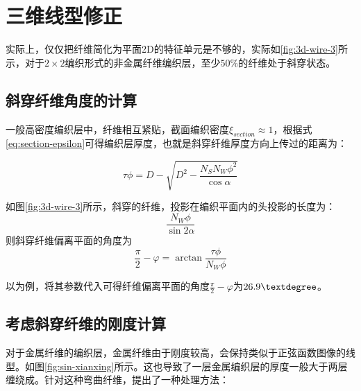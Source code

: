 \section{三维线型修正}

实际上，仅仅把纤维简化为平面2D的特征单元是不够的，实际如\ref{fig:3d-wire-3}所示，对于$ 2\times 2 $编织形式的非金属纤维编织层，至少$ 50 \% $的纤维处于斜穿状态。

\subsection{斜穿纤维角度的计算}
一般高密度编织层中，纤维相互紧贴，截面编织密度$ {\xi _{section}} \approx 1 $，根据式\ref{eq:section-epsilon}可得编织层厚度，也就是斜穿纤维厚度方向上传过的距离为：


\begin{equation}
\tau \phi  = D - \sqrt {{D^2} - \frac{{{N_S}{N_W}{\phi ^2}}}{{\cos \alpha }}} 
\end{equation}

如图\ref{fig:3d-wire-3}所示，斜穿的纤维，投影在编织平面内的头投影的长度为：
\begin{equation}
\frac{{{N_W}\phi }}{{\sin 2\alpha }}
\end{equation}
则斜穿纤维偏离平面的角度为
\begin{equation}
\frac{\pi }{2} - \varphi  = \arctan \frac{{\tau \phi}}{{{N_W}\phi }}
\end{equation}

以\shii 为例，将其参数代入可得纤维偏离平面的角度$ \frac{\pi }{2} - \varphi  $为$ 26.9\textdegree $。



\subsection{考虑斜穿纤维的刚度计算}

对于金属纤维的编织层，金属纤维由于刚度较高，会保持类似于正弦函数图像的线型。如图\ref{fig:sin-xianxing}所示。这也导致了一层金属编织层的厚度一般大于两层缠绕成。针对这种弯曲纤维，\citeauthor{russia1970}\cite{russia1970}提出了一种处理方法：

